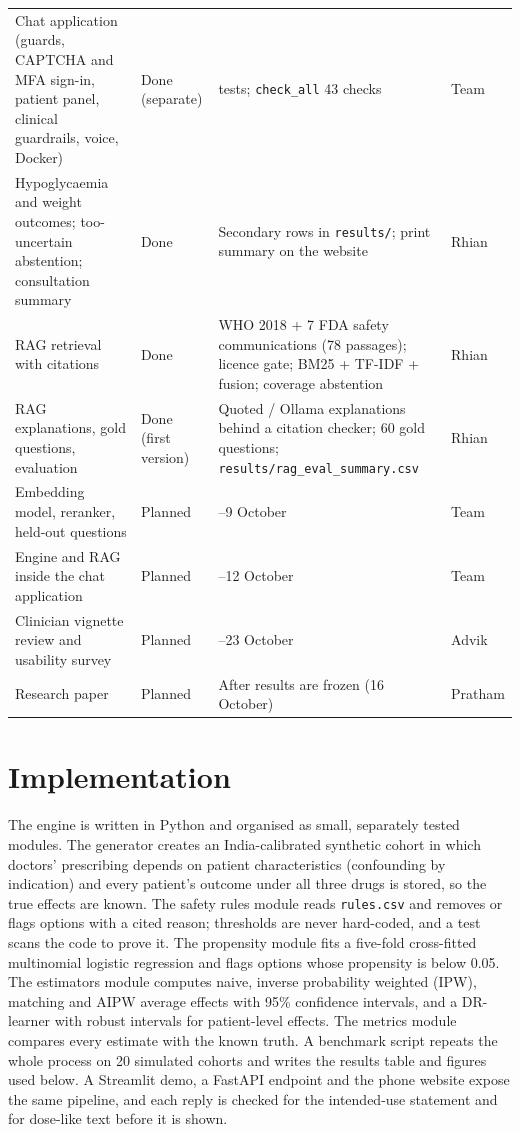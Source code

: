 \begin{longtable}{>{\raggedright\arraybackslash}p{4.1cm}>{\raggedright\arraybackslash}p{2.2cm}>{\raggedright\arraybackslash}p{6.2cm}>{\raggedright\arraybackslash}p{1.6cm}}
Chat application (guards, CAPTCHA and MFA sign-in, patient panel, clinical guardrails, voice, Docker) & Done (separate) & 630 tests; \texttt{check\_all} 43 checks & Team\\
Hypoglycaemia and weight outcomes; too-uncertain abstention; consultation summary & Done & Secondary rows in \texttt{results/}; print summary on the website & Rhian\\
RAG retrieval with citations & Done & WHO 2018 + 7 FDA safety communications (78 passages); licence gate; BM25 + TF-IDF + fusion; coverage abstention & Rhian\\
RAG explanations, gold questions, evaluation & Done (first version) & Quoted / Ollama explanations behind a citation checker; 60 gold questions; \texttt{results/rag\_eval\_summary.csv} & Rhian\\
Embedding model, reranker, held-out questions & Planned & 1--9 October & Team\\
Engine and RAG inside the chat application & Planned & 1--12 October & Team\\
Clinician vignette review and usability survey & Planned & 10--23 October & Advik\\
Research paper & Planned & After results are frozen (16 October) & Pratham\\\bottomrule
\end{longtable}

\section{Implementation}
The engine is written in Python and organised as small, separately tested modules. The generator creates an India-calibrated synthetic cohort in which doctors' prescribing depends on patient characteristics (confounding by indication) and every patient's outcome under all three drugs is stored, so the true effects are known. The safety rules module reads \texttt{rules.csv} and removes or flags options with a cited reason; thresholds are never hard-coded, and a test scans the code to prove it. The propensity module fits a five-fold cross-fitted multinomial logistic regression and flags options whose propensity is below 0.05. The estimators module computes naive, inverse probability weighted (IPW), matching and AIPW average effects with 95\% confidence intervals, and a DR-learner with robust intervals for patient-level effects. The metrics module compares every estimate with the known truth. A benchmark script repeats the whole process on 20 simulated cohorts and writes the results table and figures used below. A Streamlit demo, a FastAPI endpoint and the phone website expose the same pipeline, and each reply is checked for the intended-use statement and for dose-like text before it is shown.

